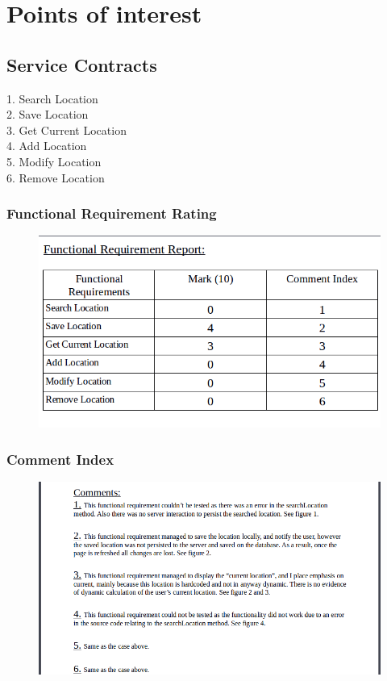 \documentclass[english]{article}
\begin{document}
\section{Points of interest}
\subsection{Service Contracts}
1. Search Location\\
2. Save Location\\
3. Get Current Location\\
4. Add Location\\
5. Modify Location\\
6. Remove Location\\
\subsubsection{Functional Requirement Rating}
\begin{figure}[H]
\hspace*{-2.5cm}
\includegraphics[width=180cm]{mark-tbl-poi.png}
\end{figure}
\subsubsection{Comment Index}
\begin{figure}[H]
\hspace*{-2.5cm}
\includegraphics[width=180cm]{comments-poi.png}
\end{figure}
\end{document}
